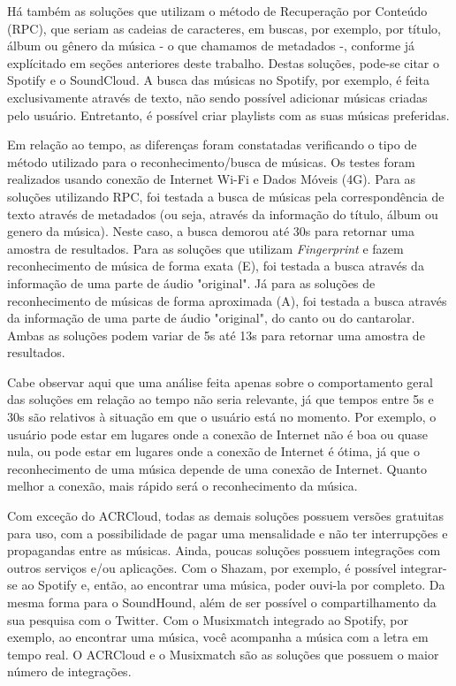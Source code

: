 Há também as soluções que utilizam o método de Recuperação por Conteúdo (RPC), que seriam as cadeias de caracteres, em buscas, por exemplo, por título, álbum ou gênero da música - o que chamamos de metadados -, conforme já explícitado em seções anteriores deste trabalho. Destas soluções, pode-se citar o Spotify e o SoundCloud. A busca das músicas no Spotify, por exemplo, é feita exclusivamente através de texto, não sendo possível adicionar músicas criadas pelo usuário. Entretanto, é possível criar playlists com as suas músicas preferidas.

Em relação ao tempo, as diferenças foram constatadas verificando o tipo de método utilizado para o reconhecimento/busca de músicas. Os testes foram realizados usando conexão de Internet Wi-Fi e Dados Móveis (4G). Para as soluções utilizando RPC, foi testada a busca de músicas pela correspondência de texto através de metadados (ou seja, através da informação do título, álbum ou genero da música). Neste caso, a busca demorou até 30s para retornar uma amostra de resultados. Para as soluções que utilizam \textit{Fingerprint} e fazem reconhecimento de música de forma exata (E), foi testada a busca através da informação de uma parte de áudio "original". Já para as soluções de reconhecimento de músicas de forma aproximada (A), foi testada a busca através da informação de uma parte de áudio "original", do canto ou do cantarolar. Ambas as soluções podem variar de 5s até 13s para retornar uma amostra de resultados.

Cabe observar aqui que uma análise feita apenas sobre o comportamento geral das soluções em relação ao tempo não seria relevante, já que tempos entre 5s e 30s são relativos à situação em que o usuário está no momento. Por exemplo, o usuário pode estar em lugares onde a conexão de Internet não é boa ou quase nula, ou pode estar em lugares onde a conexão de Internet é ótima, já que o reconhecimento de uma música depende de uma conexão de Internet. Quanto melhor a conexão, mais rápido será o reconhecimento da música.

Com exceção do ACRCloud, todas as demais soluções possuem versões gratuitas para uso, com a possibilidade de pagar uma mensalidade e não ter interrupções e propagandas entre as músicas. Ainda, poucas soluções possuem integrações com outros serviços e/ou aplicações. Com o Shazam, por exemplo, é possível integrar-se ao Spotify e, então, ao encontrar uma música, poder ouvi-la por completo. Da mesma forma para o SoundHound, além de ser possível o compartilhamento da sua pesquisa com o Twitter. Com o Musixmatch integrado ao Spotify, por exemplo, ao encontrar uma música, você acompanha a música com a letra em tempo real. O ACRCloud e o Musixmatch são as soluções que possuem o maior número de integrações.

